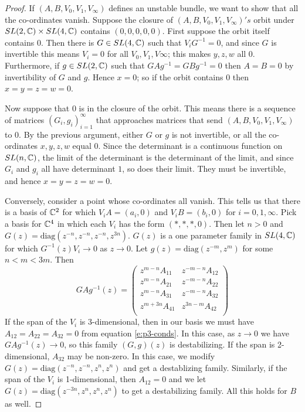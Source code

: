 	\begin{proof}

		If $(A,B,V_0,V_1,V_\infty)$ defines an unstable bundle, we want to show that all the co-ordinates vanish. Suppose the closure of $(A,B,V_0,V_1,V_\infty)'s$ orbit under $SL(2,\mathbb{C})\times SL(4,\mathbb{C})$ contains $(0,0,0,0,0)$. First suppose the orbit itself contains $0$. Then there is $G\in SL(4,\mathbb{C})$ such that $V_i G^{-1} =0$, and since $G$ is invertible this means $V_i = 0$ for all $V_0,V_1,V\infty$; this makes $y,z,w$ all 0. Furthermore, if $g\in SL(2,\mathbb{C})$ such that $GAg^{-1} = GBg^{-1} =0$ then $A=B=0$ by invertibility of $G$ and $g$. Hence $x=0$; so if the orbit contains $0$ then $x=y=z=w=0$. 
		
		Now suppose that $0$ is in the closure of the orbit. This means there is a sequence of matrices $(G_i,g_i)_{i=1}^\infty$ that approaches matrices that send $(A,B,V_0,V_1,V_\infty)$ to $0$. By the previous argument, either $G$ or $g$ is not invertible, or all the co-ordinates $x,y,z,w$ equal 0. Since the determinant is a continuous function on $SL(n,\mathbb{C})$, the limit of the determinant is the determinant of the limit, and since $G_i$ and $g_i$ all have determinant $1$, so does their limit. They must be invertible, and hence $x=y=z=w=0$.\vspace{1em}
		
		Conversely, consider a point whose co-ordinates all vanish. This tells us that there is a basis of $\mathbb{C}^2$ for which $V_i A = (a_i,0)$ and $V_i B = (b_i ,0)$ for $i=0,1,\infty$. Pick a basis for $\mathbb{C}^4$ in which each $V_i$ has the form $(\ast,\ast,\ast,0)$. Then let $n>0$ and $G(z) = \text{diag}(z^{-n}, z^{-n}, z^{-n}, z^{3n})$. $G(z)$ is a one parameter family in $SL(4,\mathbb{C})$ for which $G^{-1}(z)V_i \to 0$ as $z\to 0$. Let $g(z) = \text{diag}(z^{-m}, z^{m})$ for some $n < m < 3m$. Then
		\begin{equation}
			GAg^{-1}(z) =
			\begin{pmatrix}
			z^{m-n} A_{11} & z^{-m-n}A_{12}\\
			z^{m-n} A_{21} & z^{-m-n}A_{22}\\
			z^{m-n} A_{31} & z^{-m-n}A_{32}\\
			z^{m+3n} A_{41} & z^{3n-m}A_{42}\\
			\end{pmatrix} 
		\end{equation}
		If the span of the $V_i$ is 3-dimensional, then in our basis we must have $A_{12}=A_{22}=A_{32}=0$ from equation \ref{e:p3-conds}. In this case, as $z\to 0$ we have $GAg^{-1}(z) \to 0$, so this family $(G,g)(z)$ is destabilizing. If the span is 2-dimensional, $A_{32}$ may be non-zero. In this case, we modify $G(z) = \text{diag}(z^{-n}, z^{-n}, z^n, z^n)$ and get a destablizing family. Similarly, if the span of the $V_i$ is 1-dimensional, then $A_{12}=0$ and we let $G(z) = \text{diag}(z^{-3n}, z^n, z^n, z^n)$ to get a destabilizing family. All this holds for $B$ as well.
		

\end{proof}
